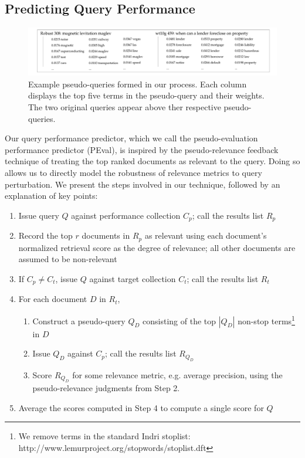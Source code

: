 \documentclass{sig-alternate}
\begin{document}
\subsection{Predicting Query Performance}\label{section.method.predicting}

\begin{figure}
\includegraphics[width=\linewidth]{figures/example-queries.pdf}
\caption{Example pseudo-queries formed in our process. Each column displays the top five terms in the pseudo-query and their weights. The two original queries appear above ther respective pseudo-queries.}
\label{figure.queries}
\end{figure}

Our query performance predictor, which we call the pseudo-evaluation performance predictor (PEval), is inspired by the pseudo-relevance feedback technique of treating the top ranked documents as relevant to the query. Doing so allows us to directly model the robustness of relevance metrics to query perturbation. We present the steps involved in our technique, followed by an explanation of key points:

\begin{enumerate}
	\item Issue query $Q$ against performance collection $C_p$; call the results list $R_p$
	\item Record the top $r$ documents in $R_p$ as relevant using each document's normalized retrieval score as the degree of relevance; all other documents are assumed to be non-relevant
	\item If $C_p \neq C_t$, issue $Q$ against target collection $C_t$; call the results list $R_t$
	\item For each document $D$ in $R_t$,
	\begin{enumerate}
		\item Construct a pseudo-query $Q_D$ consisting of the top $|Q_D|$ non-stop terms\footnote{We remove terms in the standard Indri stoplist: http://www.lemurproject.org/stopwords/stoplist.dft} in $D$
		\item Issue $Q_D$ against $C_p$; call the results list $R_{Q_D}$
		\item Score $R_{Q_D}$ for some relevance metric, e.g. average precision, using the pseudo-relevance judgments from Step 2.
	\end{enumerate}
	\item Average the scores computed in Step 4 to compute a single score for $Q$
\end{enumerate}
\end{document}
